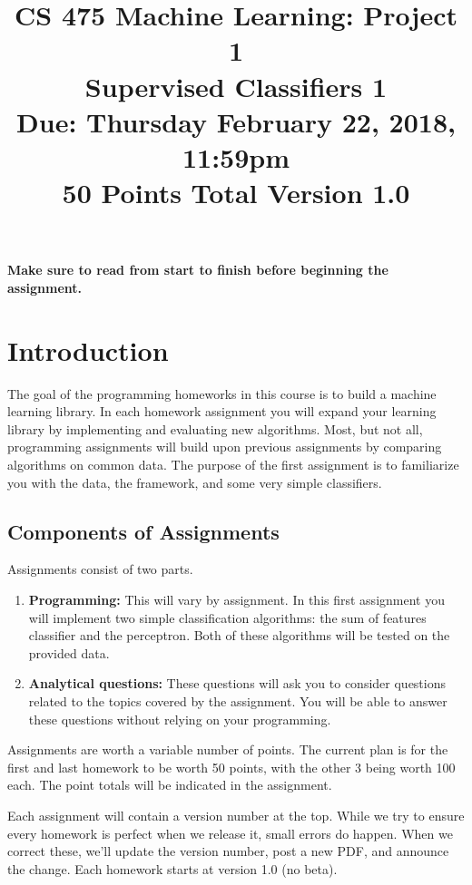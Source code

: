 \documentclass[11pt]{article}
\title{CS 475 Machine Learning: Project 1\\Supervised Classifiers 1\\
	\Large{Due: Thursday February 22, 2018, 11:59pm}\\
	50 Points Total \hspace{1cm} Version 1.0}
\author{}
\date{}
\begin{document}
	\large
	\maketitle
	\thispagestyle{headings}
	
	\vspace{-.5in}
	
	{\bf Make sure to read from start to finish before beginning the assignment.}
	\section{Introduction}
	The goal of the programming homeworks in this course is to build a machine learning library. In each homework assignment you will expand your learning library by implementing and evaluating new algorithms. Most, but not all, programming assignments will build upon previous assignments by comparing algorithms on common data. The purpose of the first assignment is to familiarize you with the data, the framework, and some very simple classifiers.
	
	\subsection{Components of Assignments}
	Assignments consist of two parts.
	\begin{enumerate}
		\item {\bf Programming:} This will vary by assignment.  In this first assignment you will implement two simple classification algorithms: the sum of features classifier and the perceptron.   Both of these algorithms will be tested on the provided data.
		\item {\bf Analytical questions:} These questions will ask you to consider questions related to the topics covered by the assignment. You will be able to answer these questions without relying on your programming.
	\end{enumerate}
	
	Assignments are worth a variable number of points.   The current plan is for the first and last homework to be worth 50 points, with the other 3 being worth 100 each. The point totals will be indicated in the assignment.
	
	Each assignment will contain a version number at the top. While we try to ensure every homework is perfect when we release it, small errors do happen. When we correct these, we'll update the version number, post a new PDF, and announce the change. Each homework starts at version 1.0 (no beta).
	
\end{document}
